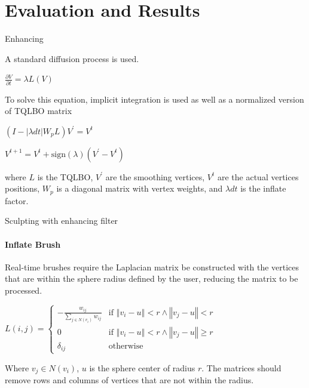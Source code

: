 \documentclass[10pt, compress, english]{beamer}
\begin{document}
\section{Evaluation and Results}
\begin{frame}{Enhancing}


A standard diffusion process is used.


\begin{center}
$\ensuremath{\frac{\partial V}{\partial t}=\lambda L\left(V\right)}$
\par\end{center}


To solve this equation, implicit integration is used as well as a
normalized version of TQLBO matrix


\begin{center}
$\left(I-\left|\lambda dt\right|W_{p}L\right)V^{\prime}=V^{t}$
\par\end{center}


\begin{center}
$\ensuremath{V^{t+1}=V^{t}+\mbox{sign}\left(\lambda\right)\left(V^{\prime}-V^{t}\right)}$
\par\end{center}


where $L$ is the TQLBO, $V^{\prime}$ are the smoothing vertices,
$V^{t}$ are the actual vertices positions, $W_{p}$ is a diagonal
matrix with vertex weights, and $\lambda dt$ is the inflate factor.

\end{frame}

\begin{frame}{Sculpting with enhancing filter}


\framesubtitle{Inflate Brush}


Real-time brushes require the Laplacian matrix be constructed with
the vertices that are within the sphere radius defined by the user,
reducing the matrix to be processed.


\begin{center}
$L\left(i,j\right)=\begin{cases}
-\frac{w_{ij}}{\underset{j\in N\left(v_{i}\right)}{\sum}w_{ij}} & \mbox{if }\left\Vert v_{i}-u\right\Vert <r\wedge\left\Vert v_{j}-u\right\Vert <r\\
0 & \mbox{if }\left\Vert v_{i}-u\right\Vert <r\wedge\left\Vert v_{j}-u\right\Vert \geq r\\
\delta_{ij} & \mbox{otherwise}
\end{cases}$
\par\end{center}


Where $v_{j}\in N\left(v_{i}\right)$, $u$ is the sphere center of
radius $r$. The matrices should remove rows and columns of vertices
that are not within the radius.

\end{frame}
\end{document}
